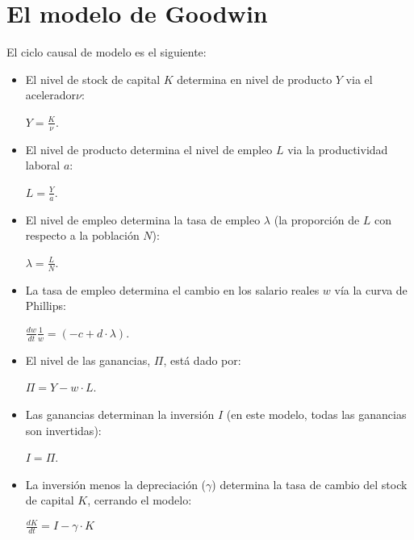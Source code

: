 \documentclass[12pt,a4paper]{article}
\author{Hermilo Cortés González}
\begin{document}
\sffamily

\section*{El modelo de Goodwin \cite{KEEN2013221}}

El ciclo causal de modelo es el siguiente:

\begin{itemize}
\item El nivel de stock de capital $K$ determina en nivel de producto $Y$ via el acelerador$\nu$:

\begin{center}
  $Y=\frac{K}{\nu}$.
\end{center}

\item El nivel de producto determina el nivel de empleo $L$ via la productividad laboral $a$: 
\begin{center}
$L=\frac{Y}{a}$.
\end{center}

\item El nivel de empleo determina la tasa de empleo $\lambda$ (la proporción de $L$ con respecto a la población $N$): 

\begin{center}
$\lambda = \frac{L}{N}$.
\end{center}

\item La tasa de empleo determina el cambio en los salario reales $w$ vía la curva de Phillips: 

\begin{center}
$\frac{dw}{dt} \frac{1}{w}=(-c + d \cdot \lambda)$.
\end{center}

\item El nivel de las ganancias, $\Pi$, está dado por: 
\begin{center}
$\Pi = Y- w \cdot L$.
\end{center}

\item Las ganancias determinan la inversión $I$ (en este modelo, todas las ganancias son invertidas): 
\begin{center}
$I = \Pi$.
\end{center}

\item La inversión menos la depreciación ($\gamma$) determina la tasa de cambio del stock de capital $K$, cerrando el modelo:
\begin{center}
$\frac{dK}{dt}= I- \gamma \cdot K$

\end{center}
\end{itemize}
\end{document}
